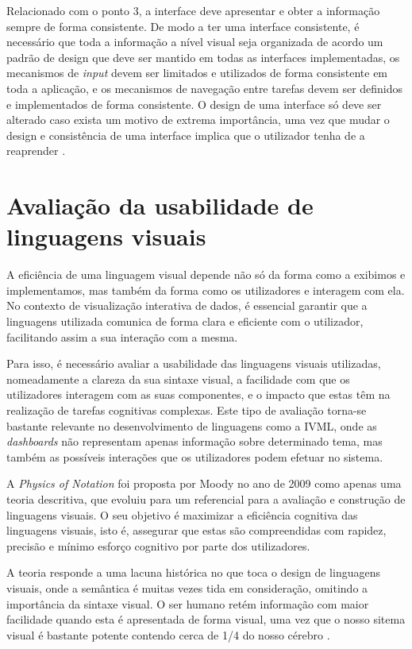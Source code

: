 Relacionado com o ponto 3, a interface deve apresentar e obter a informação sempre de forma consistente. De modo a ter uma interface consistente, é necessário que toda a informação a nível visual seja organizada de acordo um padrão de design que deve ser mantido em todas as interfaces implementadas, os mecanismos de \textit{input} devem ser limitados e utilizados de forma consistente em toda a aplicação, e os mecanismos de navegação entre tarefas devem ser definidos e implementados de forma consistente. O design de uma interface só deve ser alterado caso exista um motivo de extrema importância, uma vez que mudar o design e consistência de uma interface implica que o utilizador tenha de a reaprender \cite{sridevi2014user}.

\section{Avaliação da usabilidade de linguagens visuais} %
\label{sec:avaliacao_usabilidade}

A eficiência de uma linguagem visual depende não só da forma como a exibimos e implementamos, mas também da forma como os utilizadores e interagem com ela. No contexto de visualização interativa de dados, é essencial garantir que a linguagens utilizada comunica de forma clara e eficiente com o utilizador, facilitando assim a sua interação com a mesma. 

Para isso, é necessário avaliar a usabilidade das linguagens visuais utilizadas, nomeadamente a clareza da sua sintaxe visual, a facilidade com que os utilizadores interagem com as suas componentes, e o impacto que estas têm na realização de tarefas cognitivas complexas. Este tipo de avaliação torna-se bastante relevante no desenvolvimento de linguagens como a \gls{IVML}, onde as \textit{dashboards} não representam apenas informação sobre determinado tema, mas também as possíveis interações que os utilizadores podem efetuar no sistema.

A \textit{Physics of Notation} foi proposta por Moody no ano de 2009 como apenas uma teoria descritiva, que evoluiu para um referencial para a avaliação e construção de linguagens visuais. O seu objetivo é maximizar a eficiência cognitiva das linguagens visuais, isto é, assegurar que estas são compreendidas com rapidez, precisão e mínimo esforço cognitivo por parte dos utilizadores. 

A teoria responde a uma lacuna histórica no que toca o design de linguagens visuais, onde a semântica é muitas vezes tida em consideração, omitindo a importância da sintaxe visual. O ser humano retém informação com maior facilidade quando esta é apresentada de forma visual, uma vez que o nosso sitema visual é bastante potente contendo cerca de 1/4 do nosso cérebro \cite{moody2009physics}. %

